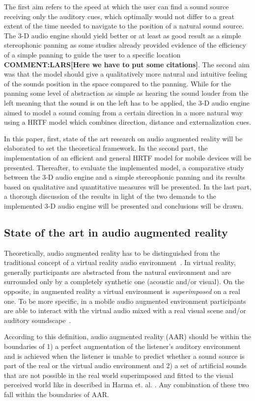 \documentclass[journal]{IEEEtran}
\begin{document}
The first aim refers to the speed at which the user can find a sound source receiving only the auditory cues, which optimally would not differ to a great extent of the time needed to navigate to the position of a natural sound source. The 3-D audio engine should yield better or at least as good result as a simple stereophonic panning as some studies already provided evidence of the efficiency of a simple panning to guide the user to a specific location\textbf{ COMMENT:LARS[Here we have to put some citations]\cite{}}. The second aim was that the model should give a qualitatively more natural and intuitive feeling of the sounds position in the space compared to the panning. While for the panning some level of abstraction as simple as hearing the sound louder from the left meaning that the sound is on the left has to be applied, the 3-D audio engine aimed to model a sound coming from a certain direction in a more natural way using a HRTF model which combines direction, distance and externalization cues.

In this paper, first, state of the art research on audio augmented reality will be elaborated to set the theoretical framework. In the second part, the implementation of an efficient and general HRTF model for mobile devices will be presented. Thereafter, to evaluate the implemented model, a comparative study between the 3-D audio engine and a simple stereophonic panning and its results based on qualitative and quantitative measures will be presented. In the last part, a thorough discussion of the results in light of the two demands to the implemented 3-D audio engine will be presented and conclusions will be drawn.

\subsection{State of the art in audio augmented reality}
Theoretically, audio augmented reality has to be distinguished from the traditional concept of a virtual reality audio environment~\cite{harma2004}. In virtual reality, generally participants are abstracted from the natural environment and are surrounded only by a completely synthetic one (acoustic and/or visual). On the opposite, in augmented reality a virtual environment is \emph{superimposed} on a real one. To be more specific, in a mobile audio augmented environment participants are able to interact with the virtual audio mixed with a real visual scene and/or auditory soundscape~\cite{alvarez2011}.

According to this definition, audio augmented reality (AAR) should be within the boundaries of 1) a perfect augmentation of the listener's auditory environment and is achieved when the listener is unable to predict whether a sound source is part of the real or the virtual audio environment and 2) a set of artificial sounds that are not possible in the real world superimposed and fitted to the visual perceived world like in described in Harma et. al. \cite{harma2004}. Any combination of these two fall within the boundaries of AAR.
\end{document}
